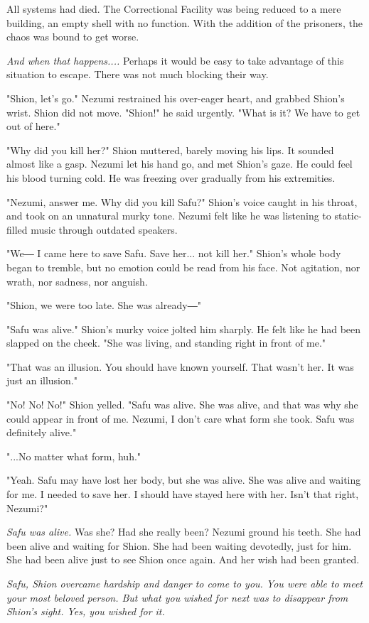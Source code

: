 All systems had died. The Correctional Facility was being reduced to a
mere building, an empty shell with no function. With the addition of the
prisoners, the chaos was bound to get worse.

\emph{And when that happens....} Perhaps it would be easy to take advantage of
this situation to escape. There was not much blocking their way.

"Shion, let's go." Nezumi restrained his over-eager heart, and grabbed
Shion's wrist. Shion did not move. "Shion!" he said urgently. "What is
it? We have to get out of here."

"Why did you kill her?" Shion muttered, barely moving his lips. It
sounded almost like a gasp. Nezumi let his hand go, and met Shion's
gaze. He could feel his blood turning cold. He was freezing over
gradually from his extremities.

"Nezumi, answer me. Why did you kill Safu?" Shion's voice caught in his
throat, and took on an unnatural murky tone. Nezumi felt like he was
listening to static-filled music through outdated speakers.

"We― I came here to save Safu. Save her... not kill her." Shion's whole
body began to tremble, but no emotion could be read from his face. Not
agitation, nor wrath, nor sadness, nor anguish.

"Shion, we were too late. She was already―"

"Safu was alive." Shion's murky voice jolted him sharply. He felt like
he had been slapped on the cheek. "She was living, and standing right in
front of me."

"That was an illusion. You should have known yourself. That wasn't her.
It was just an illusion."

"No! No! No!" Shion yelled. "Safu was alive. She was alive, and that was
why she could appear in front of me. Nezumi, I don't care what form she
took. Safu was definitely alive."

"...No matter what form, huh."

"Yeah. Safu may have lost her body, but she was alive. She was alive and
waiting for me. I needed to save her. I should have stayed here with
her. Isn't that right, Nezumi?"

\emph{Safu was alive.} Was she? Had she really been? Nezumi ground his teeth.
She had been alive and waiting for Shion. She had been waiting
devotedly, just for him. She had been alive just to see Shion once
again. And her wish had been granted.

\emph{Safu, Shion overcame hardship and danger to come to you. You were able
to meet your most beloved person. But what you wished for next was to
disappear from Shion's sight. Yes, you wished for it.}

